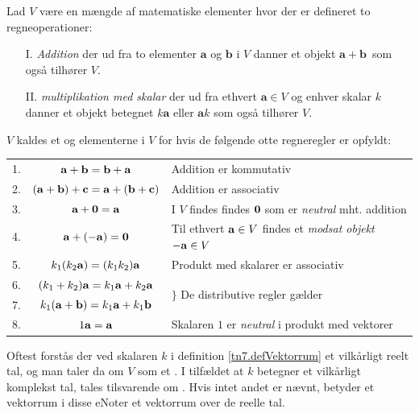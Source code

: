 \begin{definition}[Vektorrum]\label{tn7.defVektorrum}
Lad $V$ være en mængde af matematiske elementer hvor der er defineret to regneoperationer:
\begin{enumerate}
\item[I.]
\textit{Addition} der ud fra to elementer $\mathbf a$ og $\mathbf b$ i $V$ danner et objekt $\mathbf a + \mathbf b\,$ som også tilhører $V$.
\item[II.]
\textit{multiplikation med skalar} der ud fra ethvert $\mathbf a \in V$ og enhver skalar $k$ danner et objekt betegnet $k\mathbf a$ eller $\mathbf a k$ som også tilhører $V$.
\end{enumerate}
\smallskip 
$V$ kaldes et  og elementerne i $V$ for  hvis de følgende otte regneregler er opfyldt:\smallskip \\
\begin{tabular}{rcl}
1. & $ \mathbf{a} + \mathbf{b} = \mathbf{b} + \mathbf{a} $ & Addition er kommutativ \smallskip \\
2. & $ (\mathbf{a} + \mathbf{b}) + \mathbf{c} = \mathbf{a} + (\mathbf{b} + \mathbf{c}) $ & Addition er associativ \smallskip \\
3. & $ \mathbf{a} + \bm{0} = \mathbf{a} $ & I $V$ findes findes $ \bm{0}$ som er \textit{neutral} mht. addition  \smallskip \\
4. & $ \mathbf{a} + (-\mathbf{a}) = \bm{0} $ & Til ethvert $ \mathbf{a} \in V $ findes et \textit{modsat objekt} $ -\mathbf{a} \in V $ \smallskip \\
5. & $ k_1(k_2\mathbf{a}) = (k_1k_2)\mathbf{a} $ & Produkt med skalarer er associativ \smallskip \\
6. & $ (k_1 + k_2)\mathbf{a} = k_1\mathbf{a} + k_2\mathbf{a} $ & \multirow{2}{10cm}{$\biggr\rbrace$ De distributive regler gælder} \smallskip \\
7. & $ k_1(\mathbf{a}+\mathbf{b}) = k_1\mathbf{a}+ k_1 \mathbf{b} $ &  \smallskip  \\
8. & $ 1\mathbf{a} = \mathbf{a} $ & Skalaren $ 1 $ er \textit{neutral} i produkt med vektorer \\
\end{tabular}
\end{definition}

\begin{info}
Oftest forstås der ved skalaren $k$ i definition \ref{tn7.defVektorrum} et vilkårligt reelt tal, og man taler da om $V$ som et . I tilfældet at $k$ betegner et vilkårligt komplekst tal, tales tilsvarende om . Hvis intet andet er nævnt, betyder et vektorrum i disse eNoter et vektorrum over de reelle tal. 
\end{info}

